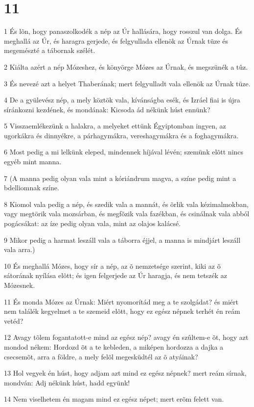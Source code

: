 \chapter{11}

\par 1 És lõn, hogy panaszolkodék a nép az Úr hallására, hogy rosszul van dolga. És meghallá az Úr, és haragra gerjede, és felgyullada ellenök az Úrnak tüze és megemészté a tábornak szélét.
\par 2 Kiálta azért a nép Mózeshez, és könyörge Mózes az Úrnak, és megszünék a tûz.
\par 3 És nevezé azt a helyet Thaberának; mert felgyulladt vala ellenök az Úrnak tüze.
\par 4 De a gyülevész nép, a mely köztök vala, kívánságba esék, és Izráel fiai is újra síránkozni kezdének, és mondának: Kicsoda ád nékünk húst ennünk?
\par 5 Visszaemlékezünk a halakra, a melyeket ettünk Égyiptomban ingyen, az ugorkákra és dinnyékre, a párhagymákra, vereshagymákra és a foghagymákra.
\par 6 Most pedig a mi lelkünk eleped, mindennek híjával lévén; szemünk elõtt nincs egyéb mint manna.
\par 7 (A manna pedig olyan vala mint a kóriándrum magva, a színe pedig mint a bdelliomnak színe.
\par 8 Kiomol vala pedig a nép, és szedik vala a mannát, és õrlik vala kézimalmokban, vagy megtörik vala mozsárban, és megfõzik vala fazékban, és csinálnak vala abból pogácsákat: az íze pedig olyan vala, mint az olajos kalácsé.
\par 9 Mikor pedig a harmat leszáll vala a táborra éjjel, a manna is mindjárt leszáll vala arra.)
\par 10 És meghallá Mózes, hogy sír a nép, az õ nemzetsége szerint, kiki az õ sátorának nyílása elõtt; és igen felgerjede az Úr haragja, és nem tetszék az Mózesnek.
\par 11 És monda Mózes az Úrnak: Miért nyomorítád meg a te szolgádat? és miért nem találék kegyelmet a te szemeid elõtt, hogy ez egész népnek terhét én reám vetéd?
\par 12 Avagy tõlem fogantatott-e mind az egész nép? avagy én szûltem-e õt, hogy azt mondod nékem: Hordozd õt a te kebleden, a miképen hordozza a dajka a csecsemõt, arra a földre, a mely felõl megesküdtél az õ atyáinak?
\par 13 Hol vegyek én húst, hogy adjam azt mind ez egész népnek? mert reám sírnak, mondván: Adj nékünk húst, hadd együnk!
\par 14 Nem viselhetem én magam mind ez egész népet; mert erõm felett van.

